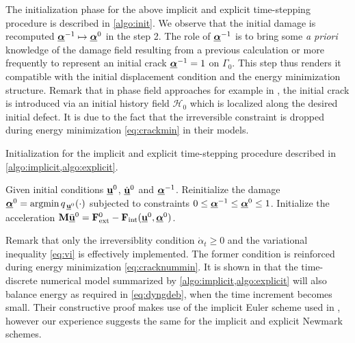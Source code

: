 The initialization phase for the above implicit and explicit time-stepping procedure is described in \cref{algo:init}. We observe that the initial damage is recomputed $\dvec^{-1}\mapsto\dvec^0$ in the step 2. The role of $\dvec^{-1}$ is to bring some \emph{a priori} knowledge of the damage field resulting from a previous calculation or more frequently to represent an initial crack $\dvec^{-1}=1$ on $\Gamma_0$. This step thus renders it compatible with the initial displacement condition and the energy minimization structure. Remark that in phase field approaches for example in \cite{BordenVerhooselScottHughesLandis:2012}, the initial crack is introduced via an initial history field $\mathcal{H}_0$ which is localized along the desired initial defect. It is due to the fact that the irreversible constraint is dropped during energy minimization \eqref{eq:crackmin} in their models.
\begin{algorithm*}[htbp]
\caption{Initialization for the implicit and explicit time-stepping procedure described in \cref{algo:implicit,algo:explicit}.} \label{algo:init}
\begin{algorithmic}[1]\linespread{1.2}\selectfont\normalsize
\State Given initial conditions $\uvec^0$, $\dot{\uvec}^0$ and $\dvec^{-1}$.
\State Reinitialize the damage $\dvec^0=\operatorname{arg min}q_{\,\uvec^0}(\cdot)$ subjected to constraints $0\leq\dvec^{-1}\leq\dvec^0\leq 1$.
\State Initialize the acceleration $\vec{M}\ddot{\uvec}^0=\vec{F}_\mathrm{ext}^0-\vec{F}_\mathrm{int}(\uvec^0,\dvec^0)$.
\end{algorithmic}
\end{algorithm*}

\begin{remark}
Remark that only the irreversiblity condition $\dot{\alpha}_t\geq 0$ and the variational inequality \eqref{eq:vi} is effectively implemented. The former condition is reinforced during energy minimization \eqref{eq:cracknummin}. It is shown in \cite{LarsenOrtnerSuli:2010} that the time-discrete numerical model summarized by \cref{algo:implicit,algo:explicit} will also balance energy as required in \eqref{eq:dyngdeb}, when the time increment becomes small. Their constructive proof makes use of the implicit Euler scheme used in \cite{Bourdin:2011}, however our experience suggests the same for the implicit and explicit Newmark schemes.
\end{remark}

